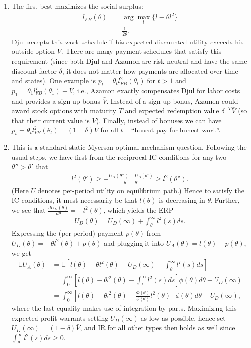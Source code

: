 \documentclass[a4paper]{article}
\begin{document}
	\begin{enumerate}
		\item The first-best maximizes the social surplus:
		\begin{align*}
			l_{FB}(\theta) &= \arg \max_l \{ l - \theta l^2 \}
			\\
			&= \frac{1}{2\theta}.
		\end{align*}
		Djul accepts this work schedule if his expected discounted utility exceeds his outside option $\bar{V}$. There are many payment schedules that satisfy this requirement (since both Djul and Azamon are risk-neutral and have the same discount factor $\delta$, it does not matter how payments are allocated over time and states). One example is $p_t = \theta_t l_{FB}^2(\theta_t)$ for $t>1$ and $p_1 = \theta_1 l_{FB}^2(\theta_1) + \bar{V}$, i.e., Azamon exactly compensates Djul for labor costs and provides a sign-up bonus $\bar{V}$. Instead of a sign-up bonus, Azamon could award stock options with maturity $T$ and expected redemption value $\delta^{-T} \bar{V}$ (so that their current value is $\bar{V}$). Finally, instead of bonuses we can have $p_t = \theta_t l_{FB}^2(\theta_t) + (1-\delta)\bar{V}$ for all $t$ -- ``honest pay for honest work''. 
		
		\item This is a standard static Myerson optimal mechanism question. Following the usual steps, we have first from the reciprocal IC conditions for any two $\theta''>\theta'$ that
		\begin{align*}
			l^2(\theta') \geq -\frac{U_D(\theta'')-U_D(\theta')}{\theta''-\theta'} \geq l^2(\theta'').
		\end{align*}
		(Here $U$ denotes per-period utility on equilibrium path.)
		Hence to satisfy the IC conditions, it must necessarily be that $l(\theta)$ is decreasing in $\theta$. Further, we see that $\frac{dU_D(\theta)}{d\theta} = -l^2(\theta)$, which yields the ERP
		\begin{align*}
			U_D(\theta) = U_D(\infty) + \int_\theta^\infty l^2(s) ds.
		\end{align*}
		Expressing the (per-period) payment $p(\theta)$ from $U_D(\theta) = -\theta l^2(\theta) + p(\theta)$ and plugging it into $U_A(\theta) = l(\theta) - p(\theta)$, we get
		\begin{align*}
			\mathbb{E} U_A(\theta) &= \mathbb{E} \left[ l(\theta) - \theta l^2(\theta) - U_D(\infty) - \int_\theta^\infty l^2(s) ds \right]
			\\
			&= \int_0^\infty \left[ l(\theta) - \theta l^2(\theta) - \int_\theta^\infty l^2(s) ds \right] \phi(\theta) d\theta - U_D(\infty)
			\\
			&= \int_0^\infty \left[ l(\theta) - \theta l^2(\theta) - \frac{\Phi(\theta)}{\phi(\theta)} l^2(\theta) \right] \phi(\theta) d\theta - U_D(\infty),
		\end{align*}
		where the last equality makes use of integration by parts.
		Maximizing this expected profit warrants setting $U_D(\infty)$ as low as possible, hence set $U_D(\infty) = (1-\delta) \bar{V}$, and IR for all other types then holds as well since $\int_{\theta}^{\infty}l^2(s)ds \geq 0$.
		

\end{enumerate}
\end{document}
